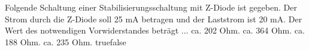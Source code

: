     {Folgende Schaltung einer Stabilisierungsschaltung mit Z-Diode ist gegeben. Der Strom durch die Z-Diode soll 25 mA betragen und der Laststrom ist 20 mA. Der Wert des notwendigen Vorwiderstandes beträgt ...}
    {ca. 202 Ohm.}
    {ca. 364 Ohm.}
    {ca. 188 Ohm.}
    {ca. 235 Ohm.}
    {true}{false}